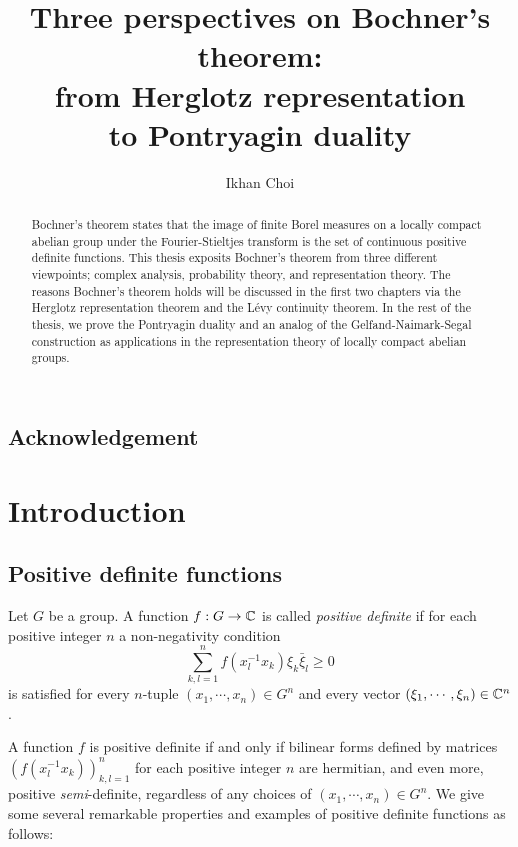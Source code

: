 \documentclass[a4paper]{article}
\title{Three perspectives on Bochner's theorem:\\from Herglotz representation\\to Pontryagin duality}
\author{Ikhan Choi}
\date{}
\begin{document}
\maketitle
\begin{abstract}
Bochner's theorem states that the image of finite Borel measures on a locally compact abelian group under the Fourier-Stieltjes transform is the set of continuous positive definite functions.
This thesis exposits Bochner's theorem from three different viewpoints; complex analysis, probability theory, and representation theory.
The reasons Bochner's theorem holds will be discussed in the first two chapters via the Herglotz representation theorem and the L\'evy continuity theorem.
In the rest of the thesis, we prove the Pontryagin duality and an analog of the Gelfand-Naimark-Segal construction as applications in the representation theory of locally compact abelian groups.
\end{abstract}
\tableofcontents

\subsection*{Acknowledgement}











\newpage
\section{Introduction}


\subsection{Positive definite functions}
\begin{defn}
Let $G$ be a group.
A function $f:G\to\mathbb{C}$ is called \emph{positive definite} if for each positive integer $n$ a non-negativity condition
\[\sum_{k,l=1}^nf(x_l^{-1}x_k)\xi_k\bar\xi_l\ge0\]
is satisfied for every $n$-tuple $(x_1,\cdots,x_n)\in G^n$ and every vector $(\xi_1,\cdots,\xi_n)\in\mathbb{C}^n$.
\end{defn}
A function $f$ is positive definite if and only if bilinear forms defined by matrices $(f(x_l^{-1}x_k))_{k,l=1}^n$ for each positive integer $n$ are hermitian, and even more, positive \emph{semi}-definite, regardless of any choices of $(x_1,\cdots,x_n)\in G^n$.
We give some several remarkable properties and examples of positive definite functions as follows:
\end{document}
